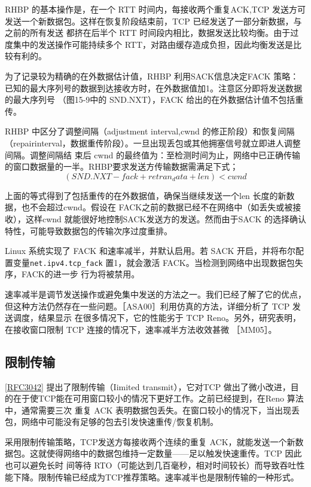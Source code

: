 RHBP 的基本操作是，在一个 RTT 时间内，每接收两个重复ACK,TCP 发送方可发送一个新数据包。这样在恢复阶段结束前，TCP 已经发送了一部分新数据，与之前的所有发送
都挤在后半个 RTT 时间段内相比，数据发送比较均衡。由于过度集中的发送操作可能持续多个 RTT，对路由缓存造成负担，因此均衡发送是比较有利的。

为了记录较为精确的在外数据估计值，RHBP 利用SACK信息决定FACK 策略：已知的最大序列号的数据到达接收方时，在外数据值加1。注意区分即将发送数据的最大序列号
（图15-9中的 SND.NXT），FACK 给出的在外数据估计值不包括重传。

RHBP 中区分了调整间隔（adjustment interval,cwnd 的修正阶段）和恢复间隔（repairinterval，数据重传阶段）。一旦出现丢包或其他拥塞信号就立即进人调整间隔。调整间隔结
束后 cwnd 的最终值为：至检测时间为止，网络中已正确传输的窗口数据量的一半。RHBP要求发送方传输数据需满足下式；
\begin{equation}
    (SND.NXT - fack + retran_ data + len) < cwnd
\end{equation}

上面的等式得到了包括重传的在外数据值，确保当继续发送一个len 长度的新数据，也不会超过cwnd。假设在 FACK之前的数据已经不在网络中（如丢失或被接收），这样cwnd
就能很好地控制SACK发送方的发送。然而由于SACK 的选择确认特性，可能导致数据包的传输次序过度重排。

Linux 系统实现了 FACK 和速率减半，并默认启用。若 SACK 开启，并将布尔配置变量\verb|net.ipv4.tcp_fack| 置1，就会激活 FACK。当检测到网络中出现数据包失序，FACK的进一步
行为将被禁用。

速率减半是调节发送操作或避免集中发送的方法之一。我们已经了解了它的优点，但这种方法仍然存在一些问题。［ASA00］利用仿真的方法，详细分析了 TCP 发送调度，结果显示
在很多情况下，它的性能劣于 TCP Reno。另外，研究表明，在接收窗口限制 TCP 连接的情况下，速率减半方法收效甚微 ［MM05］。

\subsection{限制传输}
\href{https://www.rfc-editor.org/rfc/rfc3042}{[RFC3042]} 提出了限制传输（Iimited transmit），它对TCP 做出了微小改进，目的在于使TCP能在可用窗口较小的情况下更好工作。之前已经提到，在Reno 算法中，通常需要三次
重复 ACK 表明数据包丢失。在窗口较小的情况下，当出现丢包，网络中可能没有足够的包去引发快速重传/恢复机制。

采用限制传输策略，TCP发送方每接收两个连续的重复 ACK，就能发送一个新数据包。这就使得网络中的数据包维持一定数量——足以触发快速重传。TCP 因此也可以避免长时
间等待 RTO（可能达到几百毫秒，相对时间较长）而导致吞吐性能下降。限制传输已经成为TCP推荐策略。速率减半也是限制传输的一种形式。

